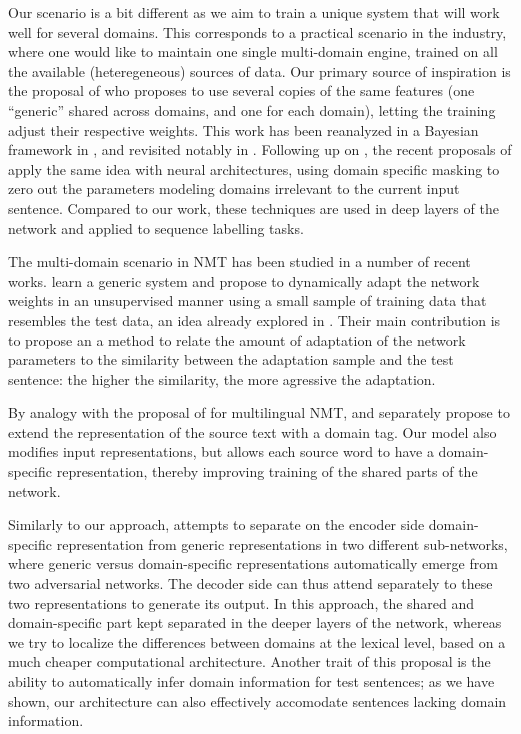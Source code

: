 \documentclass[11pt,a4paper]{article}
\newcommand{\fyDone}[1]{\done[FY]\Todo[FY:]{\textcolor{orange}{#1}}}
\begin{document}
Our scenario is a bit different as we aim to train a unique system that will work well for several domains. This corresponds to a practical scenario in the industry, where one would like to maintain one single multi-domain engine, trained on all the available (heteregeneous) sources of data. Our primary source of inspiration is the proposal of \citet{Daume07frustratingly} who proposes to use several copies of the same features (one ``generic'' shared across domains, and one for each domain), letting the training adjust their respective weights. This work has been reanalyzed in a Bayesian framework in \cite{Finkel09hierarchical}, and revisited notably in \cite{Chang10necessity}. Following up on \cite{Yang15unified}, the recent proposals of \cite{Peng17multitask} apply the same idea with neural architectures, using domain specific masking to zero out the parameters modeling domains irrelevant to the current input sentence. Compared to our work, these techniques are used in deep layers of the network and applied to sequence labelling tasks.

The multi-domain scenario in NMT has been studied in a number of recent works. \citet{Farajian17multidomain} learn a generic system and propose to dynamically adapt the network weights in an unsupervised manner using a small sample of training data that resembles the test data, an idea already explored in \cite{Sennrich13multidomain}. Their main contribution is to propose an a method to relate the amount of adaptation of the network parameters to the similarity between the adaptation sample and the test sentence: the higher the similarity, the more agressive the adaptation.

By analogy with the proposal of \citet{Johnson17google} for multilingual NMT, \citet{Kobus17domaincontrol} and \citet{Chu18multilingual} separately propose to extend the representation of the source text with a domain tag. Our model also modifies input representations, but allows each source word to have a domain-specific representation, thereby improving training of the shared parts of the network.\fyDone{Talk about target embeddings somewhere.} 

Similarly to our approach, \cite{Zeng18multidomain} attempts to separate on the encoder side domain-specific representation from generic representations in two different sub-networks, where generic versus domain-specific representations automatically emerge from two adversarial networks. The decoder side can thus attend separately to these two representations to generate its output. In this approach, the shared and domain-specific part kept separated in the deeper layers of the network, whereas we try to localize the differences between domains at the lexical level, based on a much cheaper computational architecture. Another trait of this proposal is the ability to automatically infer domain information for test sentences; as we have shown, our architecture can also effectively accomodate sentences lacking domain information.
\end{document}
